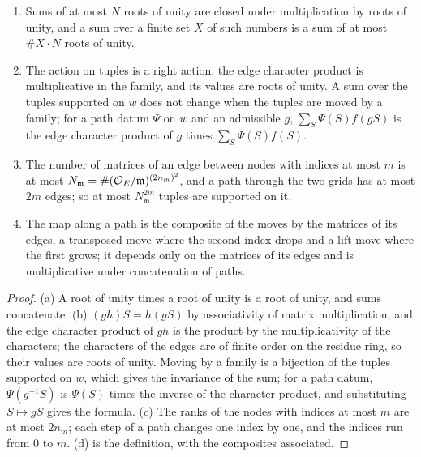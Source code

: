 \begin{lemma}\label{lem:tuples}
\begin{enumerate}[label=\textup{(\alph*)}]
\item Sums of at most $N$ roots of unity are closed under multiplication by roots of unity, and a sum over a finite set $X$ of such numbers is a sum of at most $\#X\cdot N$ roots of unity.
\item The action on tuples is a right action, the edge character product is multiplicative in the family, and its values are roots of unity. A sum over the tuples supported on $w$ does not change when the
tuples are moved by a family; for a path datum $\Psi$ on $w$ and an admissible $g$, $\sum_S\Psi(S)f(gS)$ is the edge character product of $g$ times $\sum_S\Psi(S)f(S)$.
\item The number of matrices of an edge between nodes with indices at most $m$ is at most $N_{\mathfrak m}=\#(\mathcal{O}_E/\mathfrak m)^{(2n_m)^2}$, and a path through the two grids has at most $2m$ edges; so at most $N_{\mathfrak m}^{2m}$
tuples are supported on it.
\item The map along a path is the composite of the moves by the matrices of its edges, a transposed move where the second index drops and a lift move where the first grows; it depends only on the matrices of
its edges and is multiplicative under concatenation of paths.
\end{enumerate}
\end{lemma}

\begin{proof}
(a) A root of unity times a root of unity is a root of unity, and sums concatenate. (b) $(gh)S=h(gS)$ by associativity of matrix multiplication, and the edge character product of $gh$ is the product by the
multiplicativity of the characters; the characters of the edges are of finite order on the residue ring, so their values are roots of unity. Moving by a family is a bijection of the tuples supported on $w$, which
gives the invariance of the sum; for a path datum, $\Psi(g^{-1}S)$ is $\Psi(S)$ times the inverse of the character product, and substituting $S\mapsto gS$ gives the formula. (c) The ranks of the nodes with indices at
most $m$ are at most $2n_m$; each step of a path changes one index by one, and the indices run from $0$ to $m$. (d) is the definition, with the composites associated.
\end{proof}

